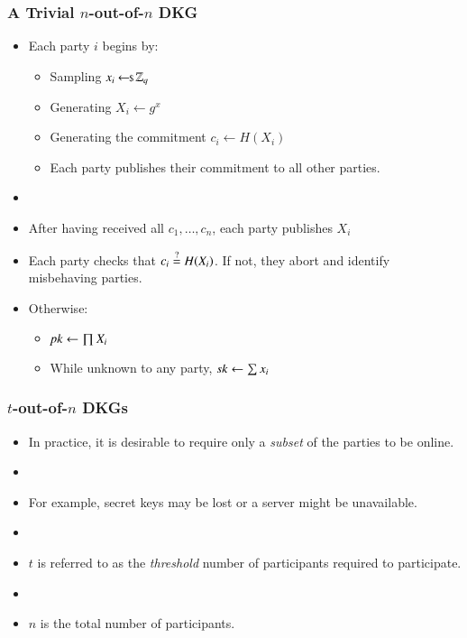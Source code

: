 \documentclass[hyperref={pdfpagelabels=true},table,dvipsnames,14pt,aspectratio=169]{beamer}
\begin{document}
\begin{frame}
  \frametitle{A Trivial $n$-out-of-$n$ DKG}

  \begin{itemize}
    \item<1-> Each party $i$ begins by:

  \begin{itemize}
    \item<2-> Sampling $x_i \hskip2.3pt{\gets\!\!\mbox{\scriptsize${\$}$\normalsize}}\, \mathbb{Z}_q$
    \item<3-> Generating $X_i \gets g^x$
    \item<4-> Generating the commitment $c_i \gets H(X_i)$
    \item<5-> Each party publishes their commitment to all other parties.
  \end{itemize}
    \item[]
    \item<6-> After having received all $c_1, \ldots, c_n$, each party publishes $X_i$
    \item<7-> Each party checks that $c_i \stackrel{?}{=} H(X_i)$. If not, they abort and identify misbehaving parties.
    \item<8-> Otherwise:
  \begin{itemize}
    \item<9-> $\mathit{pk} \gets \prod X_i$
    \item<10-> While unknown to any party, $\mathit{sk} \gets \sum x_i$
  \end{itemize}

  \end{itemize}
\end{frame}

\begin{frame}
  \frametitle{$t$-out-of-$n$ DKGs}

  \begin{itemize}
    \item In practice, it is desirable to require only a \emph{subset} of the parties to be online.
    \item[]
    \item<2-> For example, secret keys may be lost or a server might be unavailable.
    \item[]
    \item<3-> $t$ is referred to as the \emph{threshold} number of participants required to participate.
    \item[]
    \item<4-> $n$ is the total number of participants.
  \end{itemize}
\end{frame}
\end{document}
